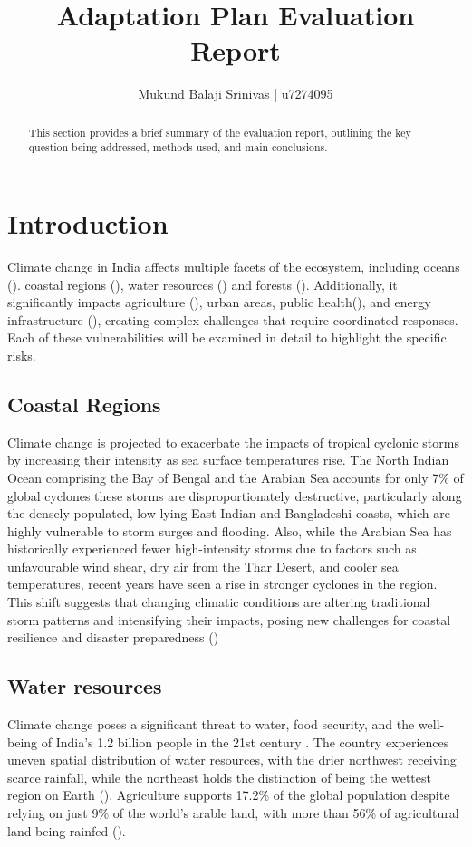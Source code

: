 \documentclass[12pt]{article}
\title{Adaptation Plan Evaluation Report}
\author{Mukund Balaji Srinivas | u7274095}
\date{} %
\begin{document}
\maketitle

\begin{abstract}
This section provides a brief summary of the evaluation report, outlining the key question being addressed, methods used, 
and main conclusions.
\end{abstract}

\newpage

\section*{Introduction}
Climate change in India affects multiple facets of the ecosystem, including oceans (\cite{marathe_2021}).
coastal regions (\cite{gupta_2019}), water resources (\cite{shiva_shankar_2021}) and forests (\cite{Lele2019ClimateCA}). Additionally, it significantly impacts 
agriculture (\cite{Kumar2023DeterminantsOC}), urban areas, public health(\cite{rajput_2022}), and energy infrastructure (\cite{Yarlagadda_22}), 
creating complex challenges that require coordinated responses. Each of these vulnerabilities will be examined in detail to highlight the specific risks.
\subsection*{Coastal Regions}
Climate change is projected to exacerbate the impacts of tropical cyclonic storms by increasing their intensity as sea surface temperatures 
rise. The North Indian Ocean comprising the Bay of Bengal and the Arabian Sea accounts for only 7\% of global cyclones 
these storms are disproportionately destructive, particularly along the densely populated, low-lying East Indian and Bangladeshi coasts, 
which are highly vulnerable to storm surges and flooding. Also, while the Arabian Sea has historically experienced fewer high-intensity storms due to 
factors such as unfavourable wind shear, dry air from the Thar Desert, and cooler sea temperatures, recent years have seen a rise in stronger cyclones 
in the region. This shift suggests that changing climatic conditions are altering traditional storm patterns and intensifying their impacts, posing 
new challenges for coastal resilience and disaster preparedness (\cite{gupta_2019})

\subsection*{Water resources}
Climate change poses a significant threat to water, food security, and the well-being of India’s 
1.2 billion people in the 21st century . The country experiences uneven spatial distribution of water resources, 
with the drier northwest receiving scarce rainfall, while the northeast holds the distinction of being the 
wettest region on Earth (\cite{goyal_2018}). Agriculture supports 17.2\% of the global population 
despite relying on just 9\% of the world’s arable land, with more than 56\% of agricultural land being rainfed (\cite{mishra_2016}). 
\end{document}
